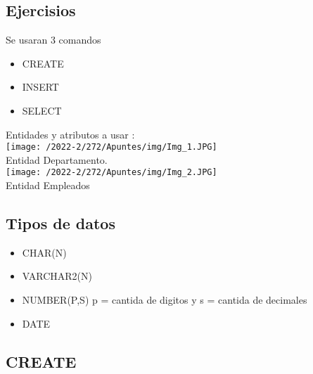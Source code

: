 \documentclass{article}
\begin{document}
\begin{multicols}{2}
            \subsection{Ejercisios}
                    Se usaran 3 comandos
                    \begin{itemize}
                        \item CREATE
                        \item INSERT
                        \item SELECT
                    \end{itemize}
                    Entidades y atributos a usar :\\
                    \texttt{[image: /2022-2/272/Apuntes/img/Img\_1.JPG]}\\
                    Entidad Departamento.\\
                    \texttt{[image: /2022-2/272/Apuntes/img/Img\_2.JPG]}\\
                    Entidad Empleados\\ 
                    \newpage                       
                    \subsection{Tipos de datos}
                    \begin{itemize}
                        \item CHAR(N)
                        \item VARCHAR2(N)
                        \item NUMBER(P,S) p = cantida de digitos y s = cantida de decimales
                        \item DATE
                    \end{itemize} 
                    
                                    
            \subsection{CREATE}
            
                \begin{tabular}{| c |}\hline            
                    

\end{tabular}
\end{multicols}
\end{document}
